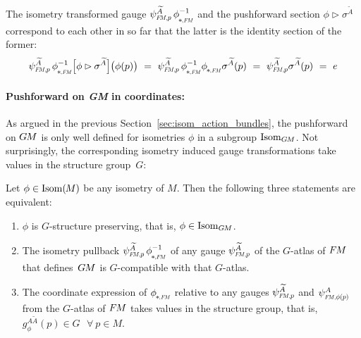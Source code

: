The isometry transformed gauge $\psiFMp^{\widetilde{A}}\, \dphiFM^{-1}$ and the pushforward section $\phi \rhd \sigma^{\widetilde{A}}$ correspond to each other in so far that the latter is the identity section of the former:
\begin{align}
    \psiFMp^{\widetilde{A}}\, \dphiFM^{-1} \pig[ \phi \rhd \sigma^{\widetilde{A}} \pig] \big(\phi(p)\big)
    \ =\ \psiFMp^{\widetilde{A}}\, \dphiFM^{-1} \dphiFM \sigma^{\widetilde{A}}(p)
    \ =\ \psiFMp^{\widetilde{A}} \sigma^{\widetilde{A}}(p)
    \ =\ e
\end{align}






\paragraph{Pushforward on \textit{GM} in coordinates:}
As argued in the previous Section~\ref{sec:isom_action_bundles}, the pushforward on $G\mkern-1.4muM$ is only well defined for isometries $\phi$ in a subgroup $\operatorname{Isom}_{G\mkern-1.4muM}$.
Not surprisingly, the corresponding isometry induced gauge transformations take values in the structure group~$G$:
\begin{thm}
\label{thm:isom_GM_in_coords}
    Let $\phi \in \operatorname{Isom}(\mkern-1.5mu M \mkern-.5mu)$ be any isometry of $M$.
    Then the following three statements are equivalent:
    \begin{enumerate}
        \item $\phi$ is $G$-structure preserving, that is, $\phi \in \operatorname{Isom}_{G\mkern-1.4muM}$.
        \item The isometry pullback $\psiFMp^{\widetilde{A}}\, \dphiFM^{-1}$ of any gauge $\psiFMp^{\widetilde{A}}$ of the $G$-atlas of $F\mkern-1.5muM$ that defines~$G\mkern-1.4muM$ is $G$-compatible with that $G$-atlas.
        \item
        The coordinate expression of $\dphiFM$ relative to any gauges $\psiFMp^{\widetilde{A}}$ and $\psiFMphip^A$ from the $G$-atlas of $F\mkern-1.5muM$ takes values in the structure group, that is, $g_\phi^{A\widetilde{A}}(p) \in G\ \ \ \forall\ p \in M$.
    \end{enumerate}
\end{thm}
